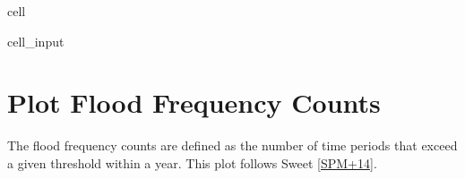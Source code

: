 \documentclass[letterpaper,10pt,english]{jupyterBook}
\begin{document}
\begin{sphinxuseclass}{cell}\begin{sphinxVerbatimInput}

\begin{sphinxuseclass}{cell_input}
\begin{sphinxVerbatim}[commandchars=\\\{\}]
  
  
\end{sphinxVerbatim}

\end{sphinxuseclass}\end{sphinxVerbatimInput}

\end{sphinxuseclass}

\section{Plot Flood Frequency Counts}
\label{\detokenize{notebooks/FloodFrequency:plot-flood-frequency-counts}}
\sphinxAtStartPar
The flood frequency counts are defined as the number of time periods that exceed a given threshold within a year. This plot follows Sweet  {[}\hyperlink{cite.notebooks/FloodFrequency:id5}{SPM+14}{]}.
\end{document}
